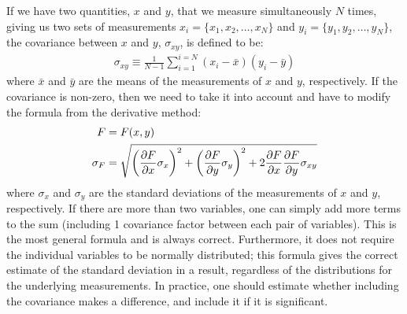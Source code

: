 \begin{chapterSummary}
If we have two quantities, $x$ and $y$, that we measure simultaneously $N$ times, giving us two sets of measurements  $x_i=\{x_1, x_2,\dots, x_N\}$ and $y_i=\{y_1, y_2,\dots, y_N\}$, the covariance between $x$ and $y$, $\sigma_{xy}$, is defined to be:
\begin{align}
\sigma_{xy}\equiv\frac{1}{N-1}\sum_{i=1}^{i=N}(x_i-\bar x)(y_i-\bar y)
\end{align}
where $\bar x$ and $\bar y$ are the means of the measurements of $x$ and $y$, respectively. If the covariance is non-zero, then we need to take it into account and have to modify the formula from the derivative method:
\begin{align}
F&=F(x,y)\nonumber\\
\sigma_{F} &= \sqrt{\left(\frac{\partial F}{\partial x}\sigma_x\right)^2 + \left(\frac{\partial F}{\partial y} \sigma_y\right)^2+2\frac{\partial F}{\partial x}\frac{\partial F}{\partial y}\sigma_{xy}}
\end{align}
where $\sigma_x$ and $\sigma_y$ are the standard deviations of the measurements of $x$ and $y$, respectively. If there are more than two variables, one can simply add more terms to the sum (including 1 covariance factor between each pair of variables). This is the most general formula and is always correct. Furthermore, it does not require the individual variables to be normally distributed; this formula gives the correct estimate of the standard deviation in a result, regardless of the distributions for the underlying measurements. In practice, one should estimate whether including the covariance makes a difference, and include it if it is significant.
\end{chapterSummary}